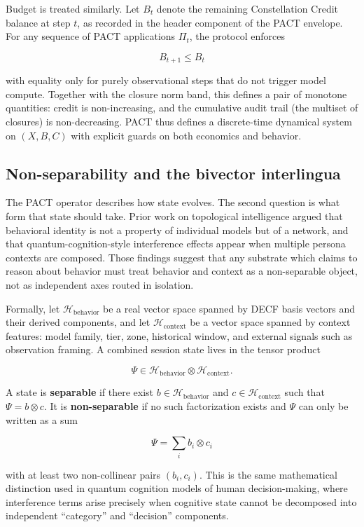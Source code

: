 Budget is treated similarly. Let \(B_t\) denote the remaining
Constellation Credit balance at step \(t\), as recorded in the header
component of the PACT envelope. For any sequence of PACT applications
\(\Pi_t\), the protocol enforces

\[
B_{t+1} \le B_t
\]

with equality only for purely observational steps that do not trigger
model compute. Together with the closure norm band, this defines a pair
of monotone quantities: credit is non-increasing, and the cumulative
audit trail (the multiset of closures) is non-decreasing. PACT thus
defines a discrete-time dynamical system on \((X, B, C)\) with explicit
guards on both economics and behavior.

\subsection{Non-separability and the bivector
interlingua}\label{non-separability-and-the-bivector-interlingua}

The PACT operator describes how state evolves. The second question is
what form that state should take. Prior work on topological intelligence
argued that behavioral identity is not a property of individual models
but of a network, and that quantum-cognition-style interference effects
appear when multiple persona contexts are composed. Those findings
suggest that any substrate which claims to reason about behavior must
treat behavior and context as a non-separable object, not as independent
axes routed in isolation.

Formally, let \(\mathcal{H}_{\text{behavior}}\) be a real vector space
spanned by DECF basis vectors and their derived components, and let
\(\mathcal{H}_{\text{context}}\) be a vector space spanned by context
features: model family, tier, zone, historical window, and external
signals such as observation framing. A combined session state lives in
the tensor product

\[
\Psi \in \mathcal{H}_{\text{behavior}} \otimes \mathcal{H}_{\text{context}}.
\]

A state is \textbf{separable} if there exist
\(b \in \mathcal{H}_{\text{behavior}}\) and
\(c \in \mathcal{H}_{\text{context}}\) such that \(\Psi = b \otimes c\).
It is \textbf{non-separable} if no such factorization exists and
\(\Psi\) can only be written as a sum

\[
\Psi = \sum_{i} b_i \otimes c_i
\]

with at least two non-collinear pairs \((b_i, c_i)\). This is the same
mathematical distinction used in quantum cognition models of human
decision-making, where interference terms arise precisely when cognitive
state cannot be decomposed into independent ``category'' and
``decision'' components.

